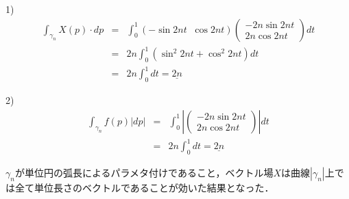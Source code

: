 \documentclass[dvipdfmx,nosetpagesize, uplatex]{jsarticle}
\theoremstyle{definition}
\theoremstyle{StatementsWithStar}
\theoremstyle{StatementsWithStar2}
\theoremstyle{StatementsWithStar3}
\theoremstyle{StatementsWithCCirc}
\theoremstyle{definition}
\begin{document}
\par
%
%
\noindent

1) 
\begin{eqnarray*}
    \int_{\gamma_n}X(p)\cdot dp &=& \int^1_0 (-\sin 2nt\;\; \cos 2nt)\left(\begin{array}{c}-2n\sin 2nt \\ 2n\cos 2nt\end{array}\right)dt \\
        &=& 2n\int^1_0 (\sin^2 2nt + \cos^2 2nt)dt \\
        &=& 2n\int^1_0 dt = \underline{2n}
\end{eqnarray*}

2)
\begin{eqnarray*}
    \int_{\gamma_n}f(p)|dp| &=& \int^1_0 \left| \left(\begin{array}{c}-2n\sin 2nt \\ 2n\cos 2nt\end{array}\right) \right|dt \\
        &=& 2n\int^1_0 dt = \underline{2n}
\end{eqnarray*}

$\gamma_n$が単位円の弧長によるパラメタ付けであること，ベクトル場$X$は曲線$|\gamma_n|$上では全て単位長さのベクトルであることが効いた結果となった．
\end{document}
